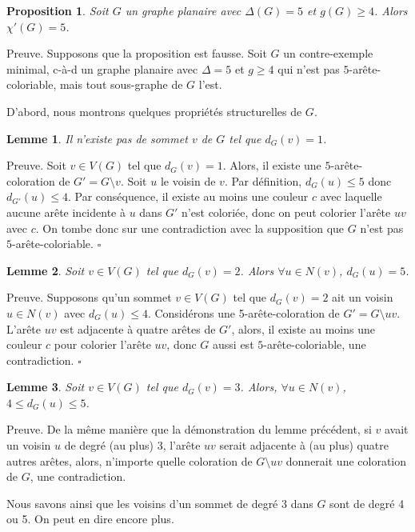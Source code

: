 \documentclass[10pt,a4paper]{article}
\newtheorem{proposition}{Proposition}
\newtheorem{lemme}{Lemme}
\newcommand{\ep}{{\hfill $\square$}}
\begin{document}
\begin{proposition}
Soit $G$ un graphe planaire avec $\Delta(G) = 5$ et $g(G) \geq 4$. Alors $\chi'(G)=5$.
\end{proposition}

Preuve. Supposons que la proposition est fausse. Soit $G$ un contre-exemple minimal, c-à-d un graphe planaire avec $\Delta = 5$ et $g \geq 4$ qui n'est pas $5$-arête-coloriable, mais tout sous-graphe de $G$ l'est.

D'abord, nous montrons quelques propriétés structurelles de $G$.

\begin{lemme}
Il n'existe pas de sommet $v$ de $G$ tel que $d_G(v) = 1$.
\label{le:1}
\end{lemme}

Preuve. Soit $v \in V(G)$ tel que $d_G(v) = 1$. Alors, il existe une $5$-arête-coloration de $G'=G \setminus v$. Soit $u$ le voisin de $v$. Par définition, $d_G(u) \leq 5$ donc $d_{G'}(u) \leq 4$. Par conséquence, il existe au moins une couleur $c$ avec laquelle aucune arête incidente à $u$ dans $G'$ n'est coloriée, donc on peut colorier l'arête $uv$ avec $c$. On tombe donc sur une contradiction avec la supposition que $G$ n'est pas $5$-arête-coloriable.
\ep

\begin{lemme}
Soit $v \in V(G)$ tel que $d_G(v) = 2$. Alors $\forall u \in N(v)$, $d_G(u) = 5$.
\label{le:2}
\end{lemme}

Preuve.
Supposons qu'un sommet $v \in V(G)$ tel que $d_G(v) = 2$ ait un voisin $u \in N(v)$ avec $d_G(u)  \le 4$. Considérons une 5-arête-coloration de $G' = G \setminus uv$.
L'arête $uv$ est adjacente à quatre arêtes de $G'$, alors, il existe au moins une couleur $c$ pour colorier l'arête $uv$, donc $G$ aussi est $5$-arête-coloriable,  une contradiction.
\ep


\begin{lemme}
Soit $v\in V(G)$ tel que $d_G(v) = 3$. Alors, $\forall u \in N(v)$, $4\le d_G(u) \le 5$.
\label{le:33}
\end{lemme}

Preuve. De la même manière que la démonstration du lemme précédent, si $v$ avait un voisin $u$ de degré (au plus) 3, l'arête $uv$ serait adjacente à (au plus) quatre autres arêtes, alors, n'importe quelle coloration de $G\setminus uv$ donnerait une coloration de $G$, une contradiction.

Nous savons ainsi que les voisins d'un sommet de degré 3 dans $G$ sont de degré 4 ou 5. On peut en dire encore plus.
\end{document}
